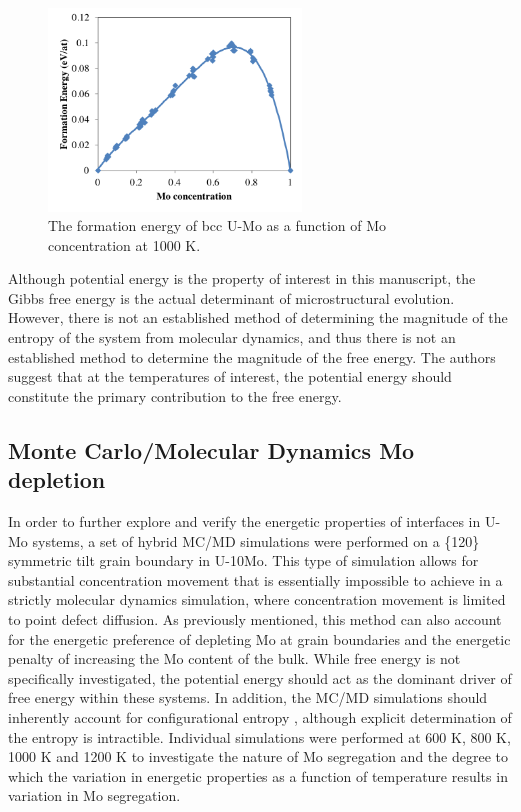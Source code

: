 \documentclass[review]{elsarticle}
\providecommand{\DIFaddtex}[1]{{\protect\color{blue} \sf #1}} %
\providecommand{\DIFaddbegin}{} %
\providecommand{\DIFaddend}{} %
\providecommand{\DIFadd}[1]{\texorpdfstring{\DIFaddtex{#1}}{#1}} %
\newcommand{\DIFaddincludegraphics}[2][]{{\color{blue}\fbox{\DIFOincludegraphics[#1]{#2}}}} %
\DeclareRobustCommand{\DIFaddbegin}{\DIFOaddbegin \let\includegraphics\DIFaddincludegraphics} %
\DeclareRobustCommand{\DIFaddend}{\DIFOaddend \let\includegraphics\DIFOincludegraphics} %
\begin{document}
\begin{figure}[h]
 \centering
 \includegraphics[width=0.6\textwidth]{umoform.png} 
 \caption{The formation energy of bcc U-Mo as a function of Mo concentration at 1000 K.}
 \label{fig:umoform}
\end{figure}

\DIFaddbegin \FloatBarrier

\DIFadd{Although potential energy is the property of interest in this manuscript, the Gibbs free energy is the actual determinant of microstructural evolution. However, there is not an established method of determining the magnitude of the entropy of the system from molecular dynamics, and thus there is not an established method to determine the magnitude of the free energy. The authors suggest that at the temperatures of interest, the potential energy should constitute the primary contribution to the free energy.
}

\DIFaddend \subsection{Monte Carlo/Molecular Dynamics Mo depletion}
In order to further explore and verify the energetic properties of interfaces in U-Mo systems, a set of hybrid MC/MD simulations were performed on a \{120\} symmetric tilt grain boundary in U-10Mo. This type of simulation allows for substantial concentration movement that is essentially impossible to achieve in a strictly molecular dynamics simulation, where concentration movement is limited to point defect diffusion. As previously mentioned, this method can also account for the energetic preference of depleting Mo at grain boundaries and the energetic penalty of increasing the Mo content of the bulk. While free energy is not specifically investigated, the potential energy should act as the dominant driver of free energy within these systems. \DIFaddbegin \DIFadd{In addition, the MC/MD simulations should inherently account for configurational entropy \cite{tepesch1998},  although explicit determination of the entropy is intractible. }\DIFaddend Individual simulations were performed at 600 K, 800 K, 1000 K and 1200 K to investigate the nature of Mo segregation and the degree to which the variation in energetic properties as a function of temperature results in variation in Mo segregation. 
\end{document}
